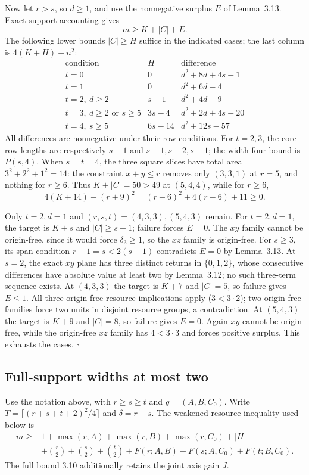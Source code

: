 \documentclass[11pt]{article}
\begin{document}
Now let $r>s$, so $d\ge1$, and use the nonnegative surplus $E$ of
Lemma~3.13.  Exact support accounting gives
\[
 m\ge K+|C|+E.\tag{3.9}
\]
The following lower bounds $|C|\ge H$ suffice in the indicated cases;
the last column is $4(K+H)-n^2$:
\[
\begin{array}{c|c|c}
 \text{condition}&H&\text{difference}\\\hline
 t=0&0&d^2+8d+4s-1\\
 t=1&0&d^2+6d-4\\
 t=2,\ d\ge2&s-1&d^2+4d-9\\
 t=3,\ d\ge2\text{ or }s\ge5&3s-4&d^2+2d+4s-20\\
 t=4,\ s\ge5&6s-14&d^2+12s-57
\end{array}
\]
All differences are nonnegative under their row conditions.
For $t=2,3$, the core row lengths are respectively $s-1$ and
$s-1,s-2,s-1$; the width-four bound is $P(s,4)$.
When $s=t=4$, the three square slices have total area
$3^2+2^2+1^2=14$: the constraint $x+y\le r$ removes only
$(3,3,1)$ at $r=5$, and nothing for $r\ge6$.
Thus $K+|C|=50>49$ at $(5,4,4)$, while for $r\ge6$,
\[
 4(K+14)-(r+9)^2=(r-6)^2+4(r-6)+11\ge0.
\]

Only $t=2,d=1$ and $(r,s,t)=(4,3,3),(5,4,3)$ remain.
For $t=2,d=1$, the target is $K+s$ and $|C|\ge s-1$;
failure forces $E=0$.  The $xy$ family cannot be origin-free,
since it would force $\delta_3\ge1$, so the $xz$ family is origin-free.
For $s\ge3$, its span condition $r-1=s<2(s-1)$ contradicts $E=0$
by Lemma~3.13.  At $s=2$, the exact $xy$ plane has three distinct
returns in $\{0,1,2\}$, whose consecutive differences have absolute
value at least two by Lemma~3.12; no such three-term sequence exists.
At $(4,3,3)$ the target is $K+7$ and $|C|=5$, so failure gives
$E\le1$.  All three origin-free resource implications apply
($3<3\cdot2$); two origin-free families force two units in disjoint
resource groups, a contradiction.
At $(5,4,3)$ the target is $K+9$ and $|C|=8$, so failure gives $E=0$.
Again $xy$ cannot be origin-free, while the origin-free $xz$ family
has $4<3\cdot3$ and forces positive surplus.
This exhausts the cases. \ensuremath{\square}

\subsection{Full-support widths at most two}

Use the notation above, with $r\ge s\ge t$ and
$g=(A,B,C_0)$.  Write $T=\lceil(r+s+t+2)^2/4\rceil$ and
$\delta=r-s$.  The weakened resource inequality used below is
\[
\begin{split}
 m\ge{}&1+\max(r,A)+\max(r,B)+\max(r,C_0)+|H|\\
 &+\binom r2+\binom s2+\binom t2
   +F(r;A,B)+F(s;A,C_0)+F(t;B,C_0).
\end{split}\tag{3.10}
\]
The full bound 3.10 additionally retains the joint axis gain $J$.
\end{document}
